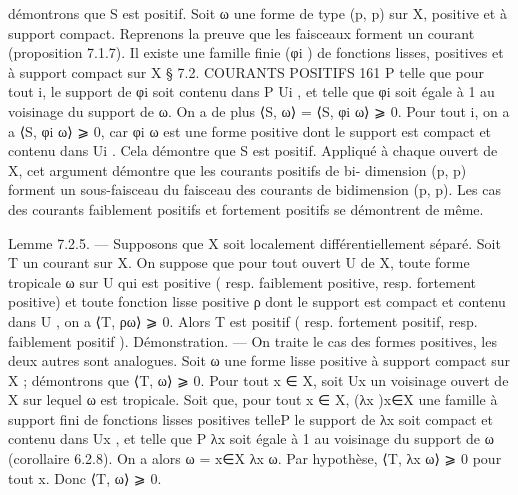 \documentclass[
  10pt,
]{article}
\newenvironment{Shaded}{}{}
\newcommand{\NormalTok}[1]{#1}
\begin{document}
\begin{Shaded}
\begin{Highlighting}[]
\NormalTok{démontrons que S est positif. Soit ω une forme de type (p, p) sur X, positive et à support}
\NormalTok{compact. Reprenons la preuve que les faisceaux forment un courant (proposition 7.1.7).}
\NormalTok{Il existe une famille finie (φi ) de fonctions lisses, positives et à support compact sur X}
\NormalTok{                                  § 7.2. COURANTS POSITIFS                                 161}
\NormalTok{                                                                              P}
\NormalTok{telle que pour tout i, le support de φi soit contenu dans P Ui , et telle que   φi soit égale}
\NormalTok{à 1 au voisinage du support de ω. On a de plus ⟨S, ω⟩ = ⟨S, φi ω⟩ ⩾ 0. Pour tout i, on}
\NormalTok{a a ⟨S, φi ω⟩ ⩾ 0, car φi ω est une forme positive dont le support est compact et contenu}
\NormalTok{dans Ui . Cela démontre que S est positif.}
\NormalTok{   Appliqué à chaque ouvert de X, cet argument démontre que les courants positifs de bi{-}}
\NormalTok{dimension (p, p) forment un sous{-}faisceau du faisceau des courants de bidimension (p, p).}
\NormalTok{Les cas des courants faiblement positifs et fortement positifs se démontrent de même.}

\NormalTok{Lemme 7.2.5. — Supposons que X soit localement différentiellement séparé. Soit T un}
\NormalTok{courant sur X. On suppose que pour tout ouvert U de X, toute forme tropicale ω sur U}
\NormalTok{qui est positive ( resp. faiblement positive, resp. fortement positive) et toute fonction lisse}
\NormalTok{positive ρ dont le support est compact et contenu dans U , on a ⟨T, ρω⟩ ⩾ 0. Alors T est}
\NormalTok{positif ( resp. fortement positif, resp. faiblement positif ).}
\NormalTok{Démonstration. — On traite le cas des formes positives, les deux autres sont analogues.}
\NormalTok{Soit ω une forme lisse positive à support compact sur X ; démontrons que ⟨T, ω⟩ ⩾ 0.}
\NormalTok{Pour tout x ∈ X, soit Ux un voisinage ouvert de X sur lequel ω est tropicale. Soit}
\NormalTok{                                                                       que, pour tout x ∈ X,}
\NormalTok{(λx )x∈X une famille à support fini de fonctions lisses positives telleP}
\NormalTok{le support de λx soit compact et contenu dans Ux , et telle que   P      λx soit égale à 1 au}
\NormalTok{voisinage du support de ω (corollaire 6.2.8). On a alors ω = x∈X λx ω. Par hypothèse,}
\NormalTok{⟨T, λx ω⟩ ⩾ 0 pour tout x. Donc ⟨T, ω⟩ ⩾ 0.}


\end{Highlighting}
\end{Shaded}
\end{document}
